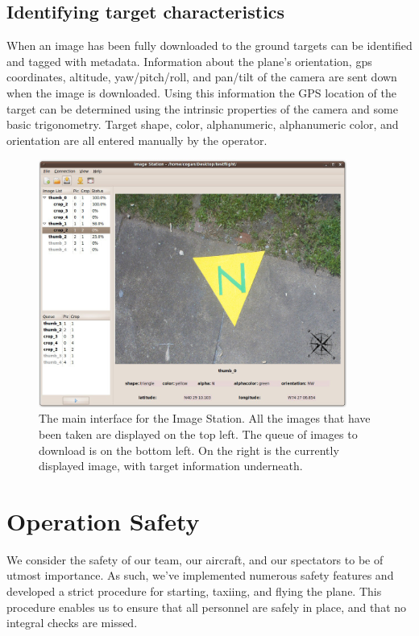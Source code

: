 \documentclass[pdftex,10pt,letter]{article}
\begin{document}
\subsection{Identifying target characteristics}

When an image has been fully downloaded to the ground targets can be identified and tagged with metadata.  Information about the plane's orientation, gps coordinates, altitude, yaw/pitch/roll, and pan/tilt of the camera are sent down when the image is downloaded.  Using this information the GPS location of the target can be determined using the intrinsic properties of the camera and some basic trigonometry. Target shape, color, alphanumeric, alphanumeric color, and orientation are all entered manually by the operator.

\begin{figure} [h]
  \centering
  	\includegraphics[width=0.9\textwidth]{../images/ImageStationMain.jpg}
  	\caption[Image Station Interface]{The main interface for the Image Station.  All the images that have been taken are displayed on the top left.  The queue of images to download is on the bottom left.  On the right is the currently displayed image, with target information underneath.}
  	\label{fig:imagestationinterface}
\end{figure}

\section{Operation Safety}

We consider the safety of our team, our aircraft, and our spectators to be of utmost importance.  As such, we've implemented numerous safety features and developed a strict procedure for starting, taxiing, and flying the plane.  This procedure enables us to ensure that all personnel are safely in place, and that no integral checks are missed.
\end{document}
